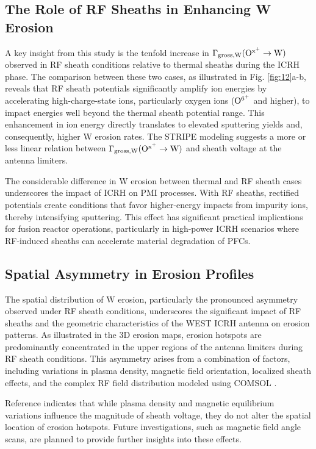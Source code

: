 \documentclass[10pt]{iopart}
\begin{document}
\subsection{The Role of RF Sheaths in Enhancing W Erosion}

A key insight from this study is the tenfold increase in $\rm \Gamma_{gross, W}(O^{x^+} \rightarrow W)$ observed in RF sheath conditions relative to thermal sheaths during the ICRH phase. The comparison between these two cases, as illustrated in Fig. \ref{fig:12}a-b, reveals that RF sheath potentials significantly amplify ion energies by accelerating high-charge-state ions, particularly oxygen ions (\( \rm O^{6^+}\) and higher), to impact energies well beyond the thermal sheath potential range. This enhancement in ion energy directly translates to elevated sputtering yields and, consequently, higher W erosion rates\cite{Klepper2022, Hakola:2021}. The STRIPE modeling suggests a more or less  linear relation between $\rm \Gamma_{gross, W}(O^{x^+} \rightarrow W)$ and sheath voltage at the antenna limiters. 

The considerable difference in W erosion between thermal and RF sheath cases underscores the impact of ICRH on PMI processes. With RF sheaths, rectified potentials create conditions that favor higher-energy impacts from impurity ions, thereby intensifying sputtering. This effect has significant practical implications for fusion reactor operations, particularly in high-power ICRH scenarios where RF-induced sheaths can accelerate material degradation of PFCs.

\subsection{Spatial Asymmetry in Erosion Profiles}
\label{subssec:72}

The spatial distribution of W erosion, particularly the pronounced asymmetry observed under RF sheath conditions, underscores the significant impact of RF sheaths and the geometric characteristics of the WEST ICRH antenna on erosion patterns. As illustrated in the 3D erosion maps, erosion hotspots are predominantly concentrated in the upper regions of the antenna limiters during RF sheath conditions. This asymmetry arises from a combination of factors, including variations in plasma density, magnetic field orientation, localized sheath effects, and the complex RF field distribution modeled using COMSOL \cite{Easley:2024}.

Reference  indicates that while plasma density and magnetic equilibrium  variations influence the magnitude of sheath voltage, they do not alter the spatial location of erosion hotspots. Future investigations, such as magnetic field angle scans, are planned to provide further insights into these effects.
\end{document}
